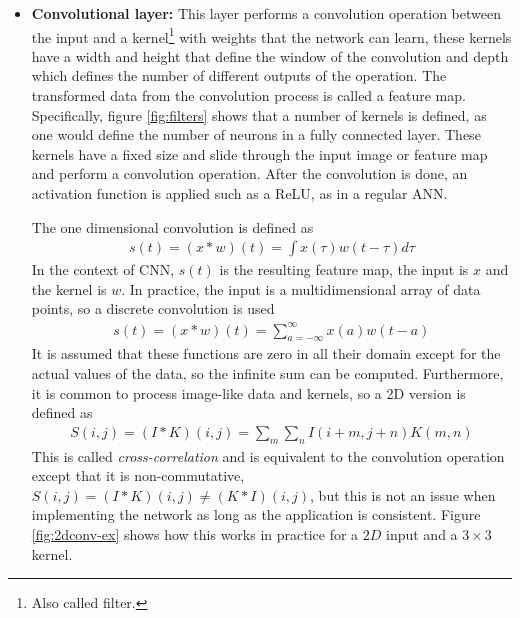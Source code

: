 \begin{itemize}
    \item \textbf{Convolutional layer:} This layer performs a convolution operation between the input and a kernel\footnote{Also called filter.} with weights that the network can learn, these kernels have a width and height that define the window of the convolution and depth which defines the number of different outputs of the operation. The transformed data from the convolution process is called a feature map. Specifically, figure \ref{fig:filters} shows that a number of kernels is defined, as one would define the number of neurons in a fully connected layer. These kernels have a fixed size and slide through the input image or feature map and perform a convolution operation. After the convolution is done, an activation function is applied such as a ReLU, as in a regular ANN.
    
    The one dimensional convolution is defined as
    \begin{align*}
        s(t) = (x *w)(t)=\int x(\tau)w(t-\tau)d\tau
    \end{align*}
    In the context of CNN, $s(t)$ is the resulting feature map, the input is $x$ and the kernel is $w$. In practice, the input is a multidimensional array of data points, so a discrete convolution is used
    \begin{align*}
        s(t) = (x *w)(t)=\sum_{a=-\infty}^\infty x(a)w(t-a)
    \end{align*}
    It is assumed that these functions are zero in all their domain except for the actual values of the data, so the infinite sum can be computed. Furthermore, it is common to process image-like data and kernels, so a 2D version is defined as
    \begin{align*}
        S(i,j)=(I * K)(i,j)=\sum_{m}\sum_{n} I(i+m,j+n)K(m,n)
    \end{align*}
    This is called \textit{cross-correlation} and is equivalent to the convolution operation except that it is non-commutative, $S(i,j) = (I*K)(i,j)\neq (K*I) (i,j) $, but this is not an issue when implementing the network as long as the application is consistent. Figure \ref{fig:2dconv-ex} shows how this works in practice for a $2D$ input and a $3\times 3$ kernel.\\
    

\end{itemize}
